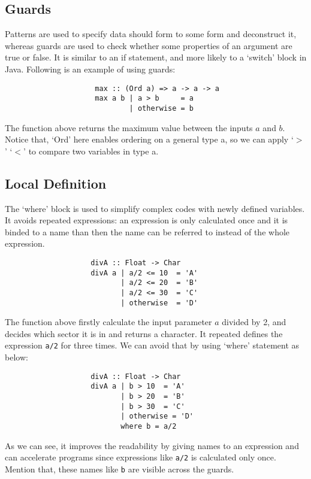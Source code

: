 \subsection{Guards}

Patterns are used to specify data should form to some form and deconstruct it, whereas guards are used to check whether some properties of an argument are true or false. It is similar to an if statement, and more likely to a `switch' block in Java. Following is an example of using guards:
\begin{verbatim}
                     max :: (Ord a) => a -> a -> a
                     max a b | a > b     = a
                             | otherwise = b
\end{verbatim}
The function above returns the maximum value between the inputs $a$ and $b$. Notice that, `Ord' here enables ordering on a general type a, so we can apply `$>$' `$<$' to compare two variables in type a.

\subsection{Local Definition}

The `where' block is used to simplify complex codes with newly defined variables. It avoids repeated expressions: an expression is only calculated once and it is binded to a name than then the name can be referred to instead of the whole expression. 

\begin{verbatim}
                    divA :: Float -> Char
                    divA a | a/2 <= 10  = 'A' 
                           | a/2 <= 20  = 'B'
                           | a/2 <= 30  = 'C'
                           | otherwise  = 'D'
\end{verbatim}

The function above firstly calculate the input parameter $a$ divided by 2, and decides which sector it is in and returns a character. It repeated defines the expression \verb|a/2| for three times. We can avoid that by using `where' statement as below: 
\begin{verbatim}
                    divA :: Float -> Char
                    divA a | b > 10  = 'A' 
                           | b > 20  = 'B'
                           | b > 30  = 'C'
                           | otherwise = 'D'
                           where b = a/2
\end{verbatim}

As we can see, it improves the readability by giving names to an expression and can accelerate programs since expressions like \verb|a/2| is calculated only once. Mention that, these names like \verb|b| are visible across the guards. 

